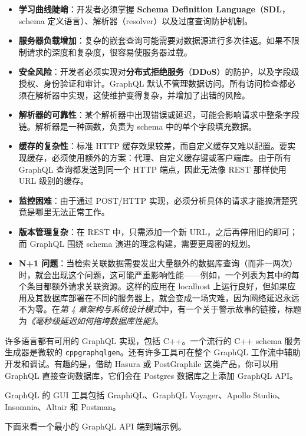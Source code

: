 \begin{itemize}
\label{idx:1648}
\item \textbf{学习曲线陡峭}：开发者必须掌握 \textbf{Schema Definition Language}（\textbf{SDL}，schema 定义语言）、解析器（resolver）以及过度查询防护机制。
\item \textbf{服务器负载增加}：复杂的嵌套查询可能需要对数据源进行多次往返。如果不限制请求的深度和复杂度，很容易使服务器过载。
\label{idx:1649}
\item \textbf{安全风险}：开发者必须实现对\textbf{分布式拒绝服务}（\textbf{DDoS}）的防护，以及字段级授权、身份验证和审计。GraphQL 默认不管理数据访问。所有访问检查都必须在解析器中实现，这使维护变得复杂，并增加了出错的风险。
\item \textbf{解析器的可靠性}：某个解析器中出现错误或延迟，可能会影响请求中整条字段链。解析器是一种函数，负责为 schema 中的单个字段填充数据。
\item \textbf{缓存的复杂性}：标准 HTTP 缓存效果较差，而自定义缓存又难以配置。要实现缓存，必须使用额外的方案：代理、自定义缓存键或客户端库。由于所有 GraphQL 查询都发送到同一个 HTTP 端点，因此无法像 REST 那样使用 URL 级别的缓存。
\item \textbf{监控困难}：由于通过 POST/HTTP 实现，必须分析具体的请求才能搞清楚究竟是哪里无法正常工作。
\item \textbf{版本管理复杂}：在 REST 中，只需添加一个新 URL，之后再停用旧的即可；而 GraphQL 围绕 schema 演进的理念构建，需要更周密的规划。
\item \textbf{N+1 问题}：当检索关联数据需要发出大量额外的数据库查询（而非一两次）时，就会出现这个问题，这可能严重影响性能——例如，一个列表为其中的每个条目都额外请求关联资源。这样的应用在 localhost 上运行良好，但如果应用及其数据库部署在不同的服务器上，就会变成一场灾难，因为网络延迟永远不为零。在\emph{第 4 章}\emph{架构与系统设计模式}中，有一个关于警示故事的链接，标题为\emph{《毫秒级延迟如何拖垮数据库性能》}。
\end{itemize}

\label{idx:1650}
许多语言都有可用的 GraphQL 实现，包括 C++。一个流行的 C++ schema 服务生成器是微软的 \texttt{cppgraphqlgen}。还有许多工具可在整个 GraphQL 工作流中辅助开发和调试。有趣的是，借助 Hasura 或 PostGraphile 这类产品，你可以用 GraphQL 直接查询数据库，它们会在 Postgres 数据库之上添加 GraphQL API。

GraphQL 的 GUI 工具包括 GraphiQL、GraphQL Voyager、Apollo Studio、Insomnia、Altair 和 Postman。

\label{idx:1651}
下面来看一个最小的 GraphQL API 端到端示例。

